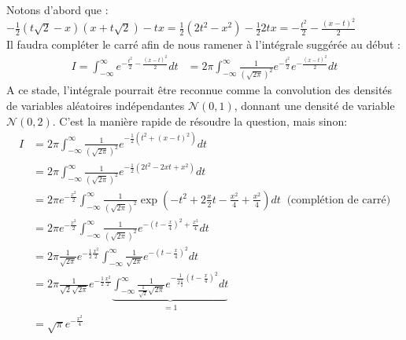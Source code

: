 \documentclass[11.5pt,french,table]{article}
\theoremstyle{exercice}
\newenvironment{packed_enum}{
\begin{enumerate}
  \setlength{\itemsep}{11pt}
  \setlength{\parskip}{0pt}
  \setlength{\parsep}{0pt}
}{\end{enumerate}}
\begin{document}
\begin{packed_enum}
    \item Notons d'abord que :\\
    $
    -\frac{1}{2}(t\sqrt{2}-x)(x+t\sqrt{2}) -tx = \frac{1}{2}(2t^2 - x^2) - \frac{1}{2}2tx  = -\frac{t^2}{2} - \frac{(x-t)^2}{2}
    $\\
    Il faudra compléter le carré afin de nous ramener à l'intégrale suggérée au début :
    \begin{align*}
        I = \int_{-\infty}^\infty e^{-\frac{t^2}{2} - \frac{(x-t)^2}{2}} dt &= 2\pi \int_{-\infty}^\infty \frac{1}{(\sqrt{2\pi})^2} e^{-\frac{t^2}{2}} e^{ - \frac{(x-t)^2}{2}}dt
    \end{align*}
    A ce stade, l'intégrale pourrait être reconnue comme la convolution des densités de variables aléatoires indépendantes $\mathcal{N}\left(0,1\right)$, donnant une densité de variable $\mathcal{N}\left(0, 2\right)$. C'est la manière rapide de résoudre la question, mais sinon:\\ 
    \begin{align*}
    I &=  2\pi \int_{-\infty}^\infty \frac{1}{(\sqrt{2\pi})^2} e^{-\frac{1}{2} \left(t^2 + (x-t)^2\right)}dt\\ 
    &=  2\pi \int_{-\infty}^\infty \frac{1}{(\sqrt{2\pi})^2} e^{-\frac{1}{2} \left(2t^2 - 2xt + x^2\right)}dt\\ 
    &= 2\pi e^{-\frac{x^2}{2}} \int_{-\infty}^\infty \frac{1}{(\sqrt{2\pi})^2} \exp{\left(-t^2 + 2\frac{x}{2}t -\frac{x^2}{4}+\frac{x^2}{4}\right)}dt \ \text{ (complétion de carré)}\\ 
    &= 2\pi e^{-\frac{x^2}{2}} \int_{-\infty}^\infty \frac{1}{(\sqrt{2\pi})^2} e^{-\left(t-\frac{x}{4}\right)^2 + \frac{x^2}{4}}dt\\ 
    &= 2\pi \frac{1}{\sqrt{2\pi}} e^{-\frac{1}{2}\frac{x^2}{2}} \int_{-\infty}^\infty  \frac{1}{\sqrt{2\pi}} e^{-\left(t-\frac{x}{4}\right)^2}dt\\ 
    &= 2\pi \frac{1}{\sqrt{2}\sqrt{2\pi}} e^{-\frac{1}{2}\frac{x^2}{2}} \underbrace{\int_{-\infty}^\infty  \frac{1}{\frac{1}{\sqrt{2}}\sqrt{2\pi}} e^{-\frac{1}{2\frac{1}{2}}\left(t-\frac{x}{4}\right)^2}dt}_{=1}\\ 
    &= \sqrt{\pi}e^{-\frac{x^2}{4}}
    \end{align*}
    


\end{packed_enum}
\end{document}
